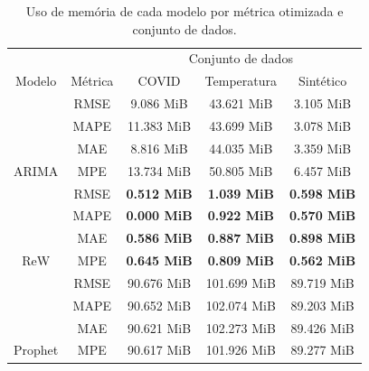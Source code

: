 \begin{table}[htbp]
    \caption{Uso de memória de cada modelo por métrica otimizada e conjunto de dados.}\label{tab:memoria}
    \centering
    \begin{tabular}{@{}ccccc@{}} \toprule
                                  &                           & \multicolumn{3}{c}{Conjunto de dados}                                                                 \\ \cmidrule{3-5}
        \multirow{-2}{*}{Modelo}  & \multirow{-2}{*}{Métrica} & \multicolumn{1}{c}{COVID}              & \multicolumn{1}{c}{Temperatura}        & Sintético          \\ \midrule
                                  & RMSE                      & \multicolumn{1}{c}{9.086 MiB}          & \multicolumn{1}{c}{43.621 MiB}         & 3.105 MiB          \\
                                  & MAPE                      & \multicolumn{1}{c}{11.383 MiB}         & \multicolumn{1}{c}{43.699 MiB}         & 3.078 MiB          \\
                                  & MAE                       & \multicolumn{1}{c}{8.816 MiB}          & \multicolumn{1}{c}{44.035 MiB}         & 3.359 MiB          \\
        \multirow{-4}{*}{ARIMA}   & MPE                       & \multicolumn{1}{c}{13.734 MiB}         & \multicolumn{1}{c}{50.805 MiB}         & 6.457 MiB          \\ \midrule
                                  & RMSE                      & \multicolumn{1}{c}{\textbf{0.512 MiB}} & \multicolumn{1}{c}{\textbf{1.039 MiB}} & \textbf{0.598 MiB} \\
                                  & MAPE                      & \multicolumn{1}{c}{\textbf{0.000 MiB}} & \multicolumn{1}{c}{\textbf{0.922 MiB}} & \textbf{0.570 MiB} \\
                                  & MAE                       & \multicolumn{1}{c}{\textbf{0.586 MiB}} & \multicolumn{1}{c}{\textbf{0.887 MiB}} & \textbf{0.898 MiB} \\
        \multirow{-4}{*}{ReW}     & MPE                       & \multicolumn{1}{c}{\textbf{0.645 MiB}} & \multicolumn{1}{c}{\textbf{0.809 MiB}} & \textbf{0.562 MiB} \\ \midrule
                                  & RMSE                      & \multicolumn{1}{c}{90.676 MiB}         & \multicolumn{1}{c}{101.699 MiB}        & 89.719 MiB         \\
                                  & MAPE                      & \multicolumn{1}{c}{90.652 MiB}         & \multicolumn{1}{c}{102.074 MiB}        & 89.203 MiB         \\
                                  & MAE                       & \multicolumn{1}{c}{90.621 MiB}         & \multicolumn{1}{c}{102.273 MiB}        & 89.426 MiB         \\
        \multirow{-4}{*}{Prophet} & MPE                       & \multicolumn{1}{c}{90.617 MiB}         & \multicolumn{1}{c}{101.926 MiB}        & 89.277 MiB         \\ \bottomrule
    \end{tabular}
\end{table}

